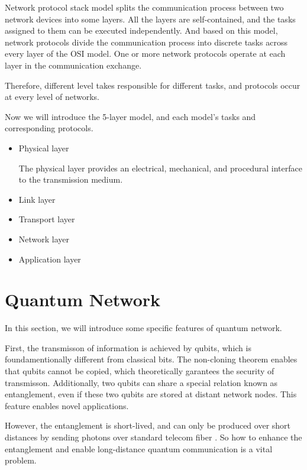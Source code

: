 \documentclass[10pt]{article}
\begin{document}
Network protocol stack model splits the communication process between two network devices into some layers. All the layers are self-contained, and the tasks assigned to them can be executed independently. And based on this model, network protocols divide the communication process into discrete tasks across every layer of the OSI model. One or more network protocols operate at each layer in the communication exchange.

Therefore, different level takes responsible for different tasks, and protocols occur at every level of networks.

Now we will introduce the 5-layer model, and each model's tasks and corresponding protocols.


\begin{itemize}
    \item Physical layer
    
    The physical layer provides an electrical, mechanical, and procedural interface to the transmission medium.
    \item Link layer
    \item Transport layer
    \item Network layer
    \item Application layer
\end{itemize}

\section{Quantum Network}

In this section, we will introduce some specific features of quantum network.

First, the transmisson of information is achieved by qubits, which is foundamentionally different from classical bits. The non-cloning theorem enables that qubits cannot be copied, which theoretically garantees the security of transmisson. Additionally, two qubits can share a special relation known as entanglement, even if these two qubits are stored at distant network nodes. This feature enables novel applications. 

However, the entanglement is short-lived, and can only be produced over short distances by sending photons over standard telecom fiber \cite{dynes2009efficient}. So how to enhance the entanglement and enable long-distance quantum communication is a vital problem.
\end{document}

